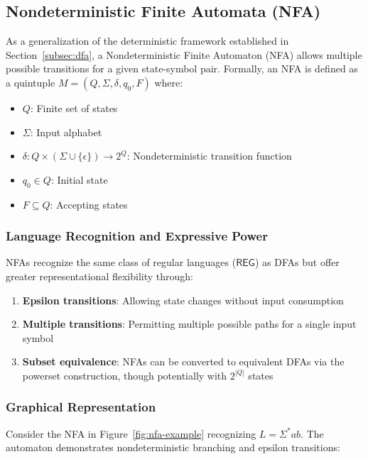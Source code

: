 \subsection{Nondeterministic Finite Automata (NFA)}
\label{subsec:nfa}

As a generalization of the deterministic framework established in Section~\ref{subsec:dfa}, a Nondeterministic Finite Automaton (NFA)\cite{hopcroft2006introduction} allows multiple possible transitions for a given state-symbol pair. Formally, an NFA is defined as a quintuple \( M = (Q, \Sigma, \delta, q_0, F) \) where:
\begin{itemize}
    \item \( Q \): Finite set of states
    \item \( \Sigma \): Input alphabet
    \item \( \delta: Q \times (\Sigma \cup \{\epsilon\}) \rightarrow 2^Q \): Nondeterministic transition function
    \item \( q_0 \in Q \): Initial state
    \item \( F \subseteq Q \): Accepting states
\end{itemize}

\subsubsection{Language Recognition and Expressive Power}
NFAs recognize the same class of regular languages (\(\mathsf{REG}\)) as DFAs but offer greater representational flexibility through:
\begin{enumerate}
    \item \textbf{Epsilon transitions}: Allowing state changes without input consumption \cite{hopcroft2006introduction}
    \item \textbf{Multiple transitions}: Permitting multiple possible paths for a single input symbol \cite{GeeksforGeeksDFA2024}
    \item \textbf{Subset equivalence}: NFAs can be converted to equivalent DFAs via the powerset construction, though potentially with \( 2^{|Q|} \) states \cite{hopcroft2006introduction}
\end{enumerate}

\subsubsection{Graphical Representation}
Consider the NFA in Figure~\ref{fig:nfa-example} recognizing \( L = \Sigma^*ab \). The automaton demonstrates nondeterministic branching and epsilon transitions:

